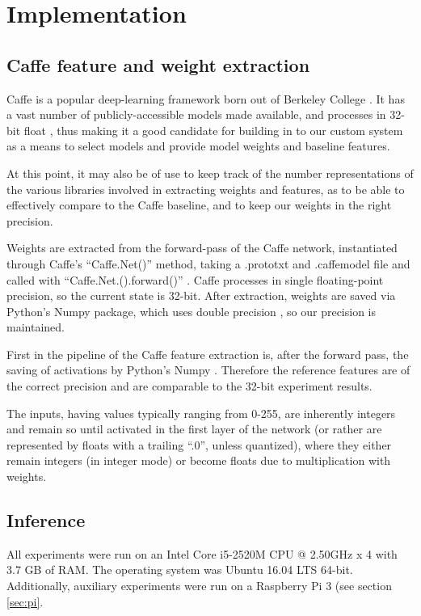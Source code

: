 \section{Implementation}
\subsection{Caffe feature and weight extraction}
\label{sec:caffe}
Caffe is a popular deep-learning framework born out of Berkeley College \cite{caffe}. It has a vast number of publicly-accessible models made available, and processes in 32-bit float \cite{caffe}, thus making it a good candidate for building in to our custom system as a means to select models and provide model weights and baseline features.

At this point, it may also be of use to keep track of the number representations of the various libraries involved in extracting weights and features, as to be able to effectively compare to the Caffe baseline, and to keep our weights in the right precision.

Weights are extracted from the forward-pass of the Caffe network, instantiated through Caffe's ``Caffe.Net()'' method, taking a .prototxt and .caffemodel file and called with ``Caffe.Net.().forward()'' \cite{caffe}. Caffe processes in single floating-point precision, so the current state is 32-bit. After extraction, weights are saved via Python's Numpy package, which uses double precision \cite{scipy}, so our precision is maintained.

First in the pipeline of the Caffe feature extraction is, after the forward pass, the saving of activations by Python's Numpy \cite{scipy}. Therefore the reference features are of the correct precision and are comparable to the 32-bit experiment results.

The inputs, having values typically ranging from 0-255, are inherently integers and remain so until activated in the first layer of the network (or rather are represented by floats with a trailing ``.0'', unless quantized), where they either remain integers (in integer mode) or become floats due to multiplication with weights.

\subsection{Inference}
All experiments were run on an Intel Core i5-2520M CPU @ 2.50GHz x 4 with 3.7 GB of RAM. The operating system was Ubuntu 16.04 LTS 64-bit. Additionally, auxiliary experiments were run on a Raspberry Pi 3 (see section \ref{sec:pi}.

